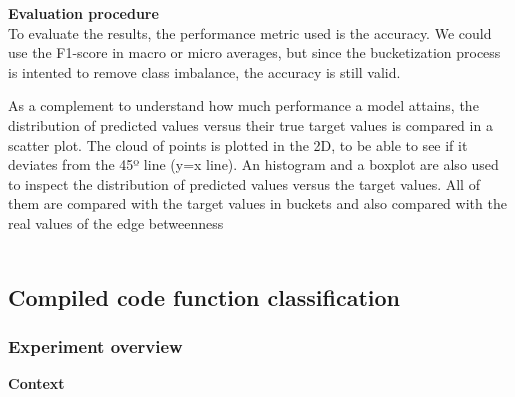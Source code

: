


\textbf{Evaluation procedure}\\
To evaluate the results, the performance metric used is the accuracy. We could use the F1-score in macro or micro averages, but since the bucketization process is intented to remove class imbalance, the accuracy is still valid.


As a complement to understand how much performance a model attains, the distribution of predicted values versus their true target values is compared in a scatter plot. The cloud of points is plotted in the 2D, to be able to see if it deviates from the 45º line (y=x line). An histogram and a boxplot are also used to inspect the distribution of predicted values versus the target values. All of them are compared with the target values in buckets and also compared with the real values of the edge betweenness \\
\\



\newpage
\subsection{Compiled code function classification}

\subsubsection{Experiment overview}

\textbf{Context}

